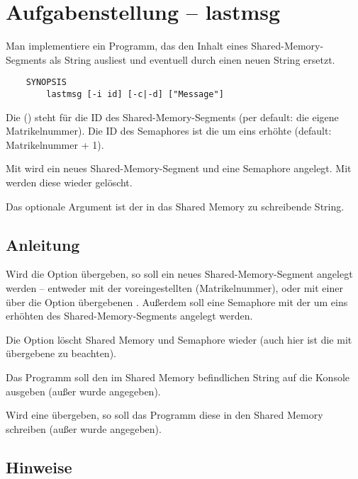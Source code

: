 




\section*{Aufgabenstellung -- lastmsg}

Man implementiere ein Programm, das den Inhalt eines Shared-Memory-Segments als
String ausliest und eventuell durch einen neuen String ersetzt.

\begin{verbatim}
    SYNOPSIS
        lastmsg [-i id] [-c|-d] ["Message"]
\end{verbatim}

Die  () steht für die ID des Shared-Memory-Segments (per
default: die eigene Matrikelnummer). Die ID des Semaphores ist die um eins
erhöhte (default: Matrikelnummer + 1).

Mit  wird ein neues Shared-Memory-Segment und eine Semaphore
angelegt. Mit  werden diese wieder gelöscht.

Das optionale Argument  ist der in das Shared
Memory zu schreibende String.

\subsection*{Anleitung}

Wird die Option  übergeben, so soll ein neues Shared-Memory-Segment
angelegt werden -- entweder mit der voreingestellten 
(Matrikelnummer), oder mit einer über die Option  übergebenen
. Außerdem soll eine Semaphore mit der um eins erhöhten 
des Shared-Memory-Segments angelegt werden.

Die Option  löscht Shared Memory und Semaphore wieder (auch hier ist
die mit  übergebene  zu beachten).

Das Programm soll den im Shared Memory befindlichen String auf die Konsole
ausgeben (außer  wurde angegeben).

Wird eine  übergeben, so soll das Programm diese
in den Shared Memory schreiben (außer  wurde angegeben).

\subsection*{Hinweise}

